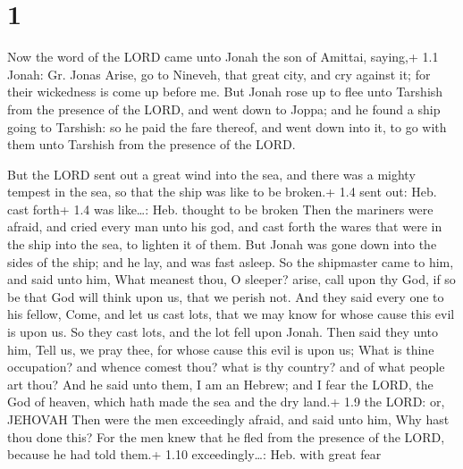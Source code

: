 \hypertarget{section}{%
\section{1}\label{section}}

 Now the word of the LORD came unto Jonah the son of
Amittai, saying,+ 1.1 Jonah: Gr. Jonas  Arise, go to
Nineveh, that great city, and cry against it; for their wickedness is
come up before me.  But Jonah rose up to flee unto Tarshish
from the presence of the LORD, and went down to Joppa; and he found a
ship going to Tarshish: so he paid the fare thereof, and went down into
it, to go with them unto Tarshish from the presence of the LORD.

 But the LORD sent out a great wind into the sea, and
there was a mighty tempest in the sea, so that the ship was like to be
broken.+ 1.4 sent out: Heb. cast forth+ 1.4 was like\ldots: Heb. thought
to be broken  Then the mariners were afraid, and cried every
man unto his god, and cast forth the wares that were in the ship into
the sea, to lighten it of them. But Jonah was gone down into the sides
of the ship; and he lay, and was fast asleep.  So the
shipmaster came to him, and said unto him, What meanest thou, O sleeper?
arise, call upon thy God, if so be that God will think upon us, that we
perish not.  And they said every one to his fellow, Come,
and let us cast lots, that we may know for whose cause this evil is upon
us. So they cast lots, and the lot fell upon Jonah.  Then
said they unto him, Tell us, we pray thee, for whose cause this evil is
upon us; What is thine occupation? and whence comest thou? what is thy
country? and of what people art thou?  And he said unto
them, I am an Hebrew; and I fear the LORD, the God of heaven, which hath
made the sea and the dry land.+ 1.9 the LORD: or, JEHOVAH 
Then were the men exceedingly afraid, and said unto him, Why hast thou
done this? For the men knew that he fled from the presence of the LORD,
because he had told them.+ 1.10 exceedingly\ldots: Heb. with great fear

